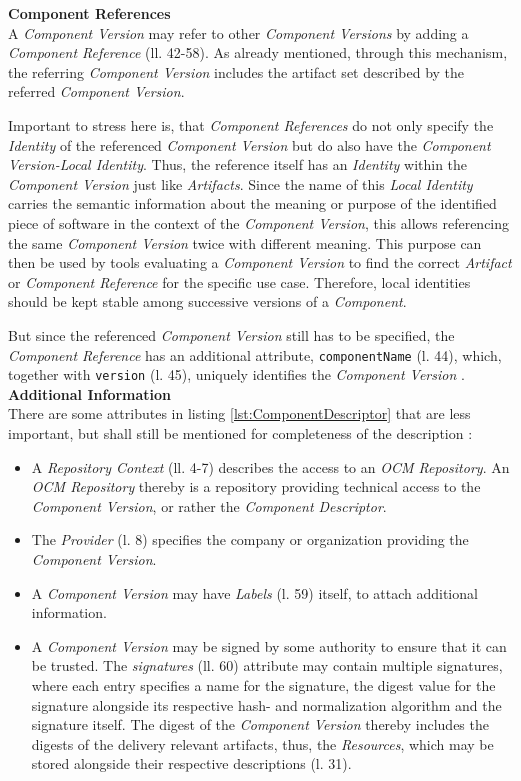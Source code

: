 \noindent\textbf{Component References}\\
A \emph{Component Version} may refer to other \emph{Component Versions} by adding a \emph{Component Reference} (ll. 42-58). As already mentioned, through this mechanism, the referring \emph{Component Version} includes the artifact set described by the referred \emph{Component Version}.\par
Important to stress here is, that \emph{Component References} do not only specify the \emph{Identity} of the referenced \emph{Component Version} but do also have the \emph{Component Version-Local Identity}. Thus, the reference itself has an \emph{Identity} within the \emph{Component Version} just like \emph{Artifacts}. Since the name of this \emph{Local Identity} carries the semantic information about the meaning or purpose of the identified piece of software in the context of the \emph{Component Version}, this allows referencing the same \emph{Component Version} twice with different meaning. This purpose can then be used by tools evaluating a \emph{Component Version} to find the correct \emph{Artifact} or \emph{Component Reference} for the specific use case. Therefore, local identities should be kept stable among successive versions of a \emph{Component}.\par
But since the referenced \emph{Component Version} still has to be specified, the \emph{Component Reference} has an additional attribute, \lstinline|componentName| (l. 44), which, together with \lstinline|version| (l. 45), uniquely identifies the \emph{Component Version} \cite{OCMSpec}.\\

\noindent\textbf{Additional Information}\\
There are some attributes in listing \ref{lst:ComponentDescriptor} that are less important, but shall still be mentioned for completeness of the description \cite{OCMSpec}:
\begin{itemize}
\item A \emph{Repository Context} (ll. 4-7) describes the access to an \emph{OCM Repository}. An \emph{OCM Repository} thereby is a repository providing technical access to the \emph{Component Version}, or rather the \emph{Component Descriptor}. 
\item The \emph{Provider} (l. 8) specifies the company or organization providing the \emph{Component Version}.
\item A \emph{Component Version} may have \emph{Labels} (l. 59) itself, to attach additional information. 
\item A \emph{Component Version} may be signed by some authority to ensure that it can be trusted. The \emph{signatures} (ll. 60) attribute may contain multiple signatures, where each entry specifies a name for the signature, the digest value for the signature alongside its respective hash- and normalization algorithm and the signature itself. The digest of the \emph{Component Version} thereby includes the digests of the delivery relevant artifacts, thus, the \emph{Resources}, which may be stored alongside their respective descriptions (l. 31).
\end{itemize}

